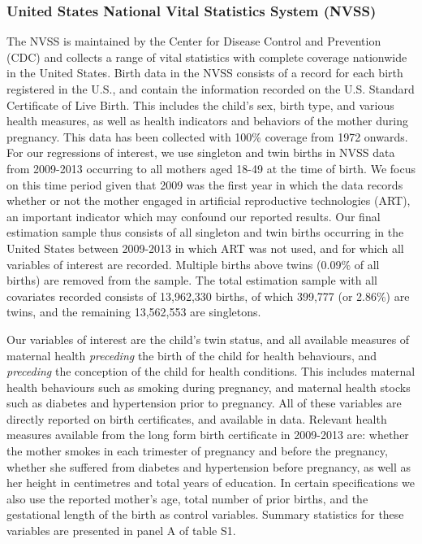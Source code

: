 \documentclass{nature}
\begin{document}
\begin{linenumbers}
\subsubsection{United States National Vital Statistics System (NVSS)}
The NVSS is maintained by the Center for Disease Control and Prevention (CDC) and collects a range of vital statistics with complete coverage nationwide in the United States. Birth data in the NVSS consists of a record for each birth registered in the U.S., and contain the information recorded on the U.S. Standard Certificate of Live Birth.  This includes the child's sex, birth type, and various health measures, as well as health indicators and behaviors of the mother during pregnancy.  This data has been collected with 100\% coverage from 1972 onwards.  For our regressions of interest, we use singleton and twin births in NVSS data from 2009-2013\cite{Martinetal2013} occurring to all mothers aged 18-49 at the time of birth.  We focus on this time period given that 2009 was the first year in which the data records whether or not the mother engaged in artificial reproductive technologies (ART), an important indicator which may confound our reported results.  Our final estimation sample thus consists of all singleton and twin births occurring in the United States between 2009-2013 in which ART was not used, and for which all variables of interest are recorded.  Multiple births above twins (0.09\% of all births) are removed from the sample.  The total estimation sample with all covariates recorded consists of 13,962,330 births, of which 399,777 (or 2.86\%) are twins, and the remaining 13,562,553 are singletons.

Our variables of interest are the child's twin status, and all available measures of maternal health \emph{preceding} the birth of the child for health behaviours, and \emph{preceding} the conception of the child for health conditions.  This includes maternal health behaviours such as smoking during pregnancy, and maternal health stocks such as diabetes and hypertension prior to pregnancy.  All of these variables are directly reported on birth certificates, and available in data.  Relevant health measures available from the long form birth certificate in 2009-2013 are: whether the mother smokes in each trimester of pregnancy and before the pregnancy, whether she suffered from diabetes and hypertension before pregnancy, as well as her height in centimetres and total years of education.  In certain specifications we also use the reported mother's age, total number of prior births, and the gestational length of the birth as control variables\cite{Hall2003,Hoekstraetal2008}.  Summary statistics for these variables are presented in panel A of table S1.


\end{linenumbers}
\end{document}
